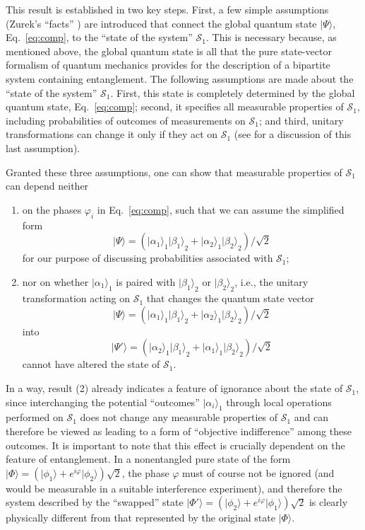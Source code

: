 \documentclass[twocolumn,aps,floatfix,amsmath,amssymb,showpacs,nofootinbib]{revtex4}
\newcommand{\be}{\begin{equation}} \newcommand{\ee}{\end{equation}}
\newcommand{\bn}{\begin{enumerate}} \newcommand{\en}{\end{enumerate}}
\newcommand{\ket}[1]{\ensuremath{|{#1\rangle}}}
\begin{document}
This result is established in two key steps. First, a few simple
assumptions (Zurek's ``facts'' \cite{Zurek:2004:yb}) are introduced
that connect the global quantum state $\ket{\Psi}$,
Eq.~\eqref{eq:comp}, to the ``state of the system'' $\mathcal{S}_1$.
This is necessary because, as mentioned above, the global quantum
state is all that the pure state-vector formalism of quantum mechanics
provides for the description of a bipartite system containing
entanglement.  The following assumptions are made about the ``state of
the system'' $\mathcal{S}_1$. First, this state is completely
determined by the global quantum state, Eq.~\eqref{eq:comp}; second,
it specifies all measurable properties of $\mathcal{S}_1$, including
probabilities of outcomes of measurements on $\mathcal{S}_1$; and
third, unitary transformations can change it only if they act on
$\mathcal{S}_1$ (see \cite{Schlosshauer:2003:ms} for a discussion
of this last assumption).

Granted these three assumptions, one can show that measurable
properties of $\mathcal{S}_1$ can depend neither 

\bn

\item on the phases $\varphi_i$ in Eq.~\eqref{eq:comp}, such that we can
  assume the simplified form
%
\be
\ket{\Psi} = \left( \ket{\alpha_1}_1 \ket{\beta_1}_2
  + \ket{\alpha_2}_1 \ket{\beta_2}_2 \right) / \sqrt{2}
\ee
%
for our purpose of discussing probabilities associated with
$\mathcal{S}_1$;

\item nor on whether $\ket{\alpha_1}_1$ is paired with
  $\ket{\beta_1}_2$ or $\ket{\beta_2}_2$, i.e., the unitary
  transformation acting on $\mathcal{S}_1$ that changes the quantum
  state vector
%
\be
\ket{\Psi} = \left( \ket{\alpha_1}_1 \ket{\beta_1}_2
  + \ket{\alpha_2}_1 \ket{\beta_2}_2 \right) / \sqrt{2}
\ee
%
into
%
\be
\ket{\Psi'} = \left( \ket{\alpha_2}_1 \ket{\beta_1}_2
  + \ket{\alpha_1}_1 \ket{\beta_2}_2 \right) / \sqrt{2}
\ee
%
cannot have altered the state of $\mathcal{S}_1$.

\en

In a way, result (2) already indicates a feature of ignorance about
the state of $\mathcal{S}_1$, since interchanging the potential
``outcomes'' $\ket{\alpha_i}_1$ through local operations performed on
$\mathcal{S}_1$ does not change any measurable properties of
$\mathcal{S}_1$ and can therefore be viewed as leading to a form of
``objective indifference'' among these outcomes. It is important to
note that this effect is crucially dependent on the feature of
entanglement. In a nonentangled pure state of the form $\ket{\Phi} =
\left( \ket{\phi_1} + e^{i\varphi} \ket{\phi_2} \right) \sqrt{2}$, the
phase $\varphi$ must of course not be ignored (and would be measurable
in a suitable interference experiment), and therefore the system
described by the ``swapped'' state $\ket{\Phi'} = \left( \ket{\phi_2}
  + e^{i\varphi} \ket{\phi_1} \right) \sqrt{2}$ is clearly physically
different from that represented by the original state $\ket{\Phi}$.
\end{document}
